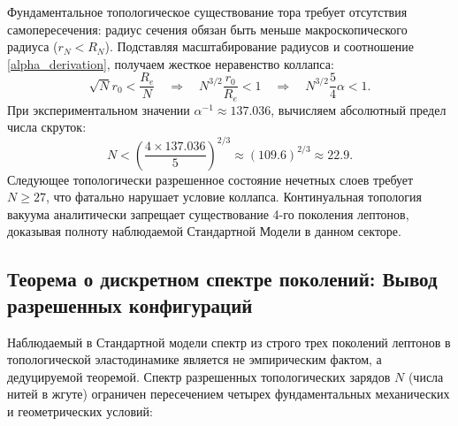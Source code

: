 \documentclass[11pt,a4paper]{article}
\begin{document}
	Фундаментальное топологическое существование тора требует отсутствия самопересечения: радиус сечения обязан быть меньше макроскопического радиуса ($r_N < R_N$). Подставляя масштабирование радиусов и соотношение \eqref{alpha_derivation}, получаем жесткое неравенство коллапса:
	\begin{equation}
		\sqrt{N} r_0 < \frac{R_e}{N} \quad \Longrightarrow \quad N^{3/2} \frac{r_0}{R_e} < 1 \quad \Longrightarrow \quad N^{3/2} \frac{5}{4}\alpha < 1.
	\end{equation}
	При экспериментальном значении $\alpha^{-1} \approx 137.036$, вычисляем абсолютный предел числа скруток:
	\begin{equation}
		N < \left( \frac{4 \times 137.036}{5} \right)^{2/3} \approx (109.6)^{2/3} \approx 22.9.
	\end{equation}
	Следующее топологически разрешенное состояние нечетных слоев требует $N \ge 27$, что фатально нарушает условие коллапса. Континуальная топология вакуума аналитически запрещает существование 4-го поколения лептонов, доказывая полноту наблюдаемой Стандартной Модели в данном секторе.
	
	\subsection{Теорема о дискретном спектре поколений: Вывод разрешенных конфигураций}
	Наблюдаемый в Стандартной модели спектр из строго трех поколений лептонов в топологической эластодинамике является не эмпирическим фактом, а дедуцируемой теоремой. Спектр разрешенных топологических зарядов $N$ (числа нитей в жгуте) ограничен пересечением четырех фундаментальных механических и геометрических условий:
	
\end{document}
